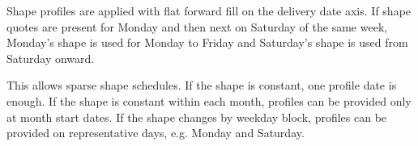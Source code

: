 Shape profiles are applied with flat forward fill on the delivery date axis. If shape quotes are present for Monday and then next on Saturday of the same week, Monday's shape is used for Monday to Friday and Saturday's shape is used from Saturday onward.

This allows sparse shape schedules. If the shape is constant, one profile date is enough. If the shape is constant within each month, profiles can be provided only at month start dates. If the shape changes by weekday block, profiles can be provided on representative days, e.g. Monday and Saturday.
